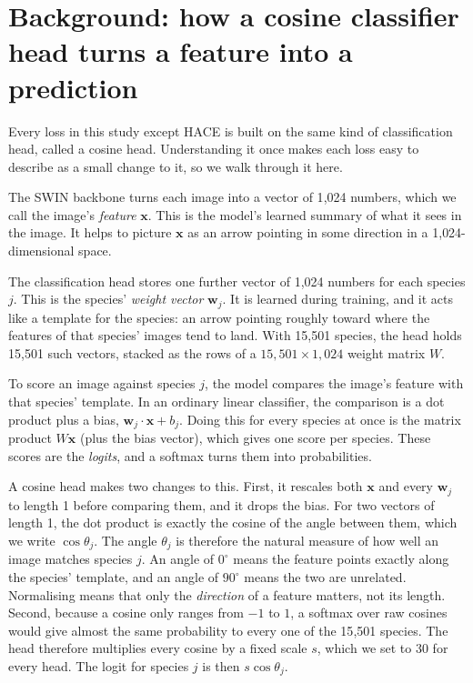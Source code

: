\documentclass[11pt]{article}
\begin{document}
\section{Background: how a cosine classifier head turns a feature into a prediction}
\label{sec:heads}

Every loss in this study except HACE is built on the same kind of classification head,
called a cosine head. Understanding it once makes each loss easy to describe as a small
change to it, so we walk through it here.

The SWIN backbone turns each image into a vector of 1{,}024 numbers, which we call the
image's \emph{feature} $\mathbf{x}$. This is the model's learned summary of what it sees
in the image. It helps to picture $\mathbf{x}$ as an arrow pointing in some direction in
a 1{,}024-dimensional space.

The classification head stores one further vector of 1{,}024 numbers for each species
$j$. This is the species' \emph{weight vector} $\mathbf{w}_j$. It is learned during
training, and it acts like a template for the species: an arrow pointing roughly toward
where the features of that species' images tend to land. With 15{,}501 species, the
head holds 15{,}501 such vectors, stacked as the rows of a $15{,}501 \times 1{,}024$
weight matrix $W$.

To score an image against species $j$, the model compares the image's feature with that
species' template. In an ordinary linear classifier, the comparison is a dot product
plus a bias, $\mathbf{w}_j \cdot \mathbf{x} + b_j$. Doing this for every species at
once is the matrix product $W\mathbf{x}$ (plus the bias vector), which gives one score
per species. These scores are the \emph{logits}, and a softmax turns them into
probabilities.

A cosine head makes two changes to this. First, it rescales both $\mathbf{x}$ and every
$\mathbf{w}_j$ to length 1 before comparing them, and it drops the bias. For two vectors
of length 1, the dot product is exactly the cosine of the angle between them, which we
write $\cos\theta_j$. The angle $\theta_j$ is therefore the natural measure of how well
an image matches species $j$. An angle of $0^\circ$ means the feature points exactly
along the species' template, and an angle of $90^\circ$ means the two are unrelated.
Normalising means that only the \emph{direction} of a feature matters, not its length.
Second, because a cosine only ranges from $-1$ to $1$, a softmax over raw cosines would
give almost the same probability to every one of the 15{,}501 species. The head
therefore multiplies every cosine by a fixed scale $s$, which we set to 30 for every
head. The logit for species $j$ is then $s\cos\theta_j$.
\end{document}
